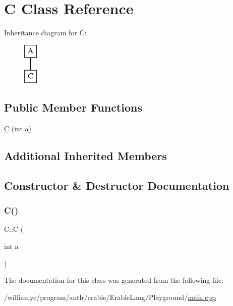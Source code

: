 \hypertarget{class_c}{}\section{C Class Reference}
\label{class_c}
Inheritance diagram for C\+:\begin{figure}[H]
\begin{center}
\leavevmode
\includegraphics[height=2.000000cm]{class_c}
\end{center}
\end{figure}
\subsection*{Public Member Functions}
\begin{DoxyCompactItemize}
\item 
\mbox{\hyperlink{class_c_a16ec3b6fcac532166d6fb2420e3558ab}{C}} (int \mbox{\hyperlink{class_a_a49a53415abd8f1b26235579cc805a15f}{a}})
\end{DoxyCompactItemize}
\subsection*{Additional Inherited Members}


\subsection{Constructor \& Destructor Documentation}
\mbox{\label{class_c_a16ec3b6fcac532166d6fb2420e3558ab}} 
\subsubsection{\texorpdfstring{C()}{C()}}
{\footnotesize\ttfamily C\+::C (\begin{DoxyParamCaption}\item[{int}]{a }\end{DoxyParamCaption})\hspace{0.3cm}{\ttfamily [inline]}}



The documentation for this class was generated from the following file\+:\begin{DoxyCompactItemize}
\item 
/williamye/program/antlr/erable/\+Erable\+Lang/\+Playground/\mbox{\hyperlink{_playground_2main_8cpp}{main.\+cpp}}\end{DoxyCompactItemize}
